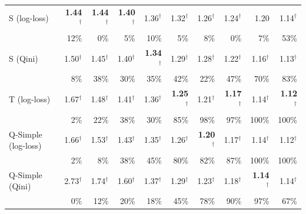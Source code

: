 \begin{tabular}{l|rrrrrrrrr}
\hline
S (log-loss) & \textbf{1.44}$^\dagger$ & \textbf{1.44}$^\dagger$ & \textbf{1.40}$^\dagger$ & 1.36$^\dagger$ & 1.32$^\dagger$ & 1.26$^\dagger$ & 1.24$^\dagger$ & 1.20 & 1.14$^\dagger$ \\
 & \scriptsize 12\% & \scriptsize 0\% & \scriptsize 5\% & \scriptsize 10\% & \scriptsize 5\% & \scriptsize 8\% & \scriptsize 0\% & \scriptsize 7\% & \scriptsize 53\% \\[2pt]
S (Qini) & 1.50$^\dagger$ & 1.45$^\dagger$ & 1.40$^\dagger$ & \textbf{1.34}$^\dagger$ & 1.29$^\dagger$ & 1.28$^\dagger$ & 1.22$^\dagger$ & 1.16$^\dagger$ & 1.13$^\dagger$ \\
 & \scriptsize 8\% & \scriptsize 38\% & \scriptsize 30\% & \scriptsize 35\% & \scriptsize 42\% & \scriptsize 22\% & \scriptsize 47\% & \scriptsize 70\% & \scriptsize 83\% \\[2pt]
T (log-loss) & 1.67$^\dagger$ & 1.48$^\dagger$ & 1.41$^\dagger$ & 1.36$^\dagger$ & \textbf{1.25}$^\dagger$ & 1.21$^\dagger$ & \textbf{1.17}$^\dagger$ & 1.14$^\dagger$ & \textbf{1.12}$^\dagger$ \\
 & \scriptsize 2\% & \scriptsize 22\% & \scriptsize 38\% & \scriptsize 30\% & \scriptsize 85\% & \scriptsize 98\% & \scriptsize 97\% & \scriptsize 100\% & \scriptsize 100\% \\[2pt]
Q-Simple (log-loss) & 1.66$^\dagger$ & 1.53$^\dagger$ & 1.43$^\dagger$ & 1.35$^\dagger$ & 1.26$^\dagger$ & \textbf{1.20}$^\dagger$ & 1.17$^\dagger$ & 1.14$^\dagger$ & 1.12$^\dagger$ \\
 & \scriptsize 2\% & \scriptsize 8\% & \scriptsize 38\% & \scriptsize 45\% & \scriptsize 80\% & \scriptsize 82\% & \scriptsize 87\% & \scriptsize 100\% & \scriptsize 100\% \\[2pt]
Q-Simple (Qini) & 2.73$^\dagger$ & 1.74$^\dagger$ & 1.60$^\dagger$ & 1.37$^\dagger$ & 1.29$^\dagger$ & 1.23$^\dagger$ & 1.18$^\dagger$ & \textbf{1.14}$^\dagger$ & 1.14$^\dagger$ \\
 & \scriptsize 0\% & \scriptsize 12\% & \scriptsize 20\% & \scriptsize 18\% & \scriptsize 45\% & \scriptsize 78\% & \scriptsize 90\% & \scriptsize 97\% & \scriptsize 67\% \\[2pt]
\hline
\end{tabular}
